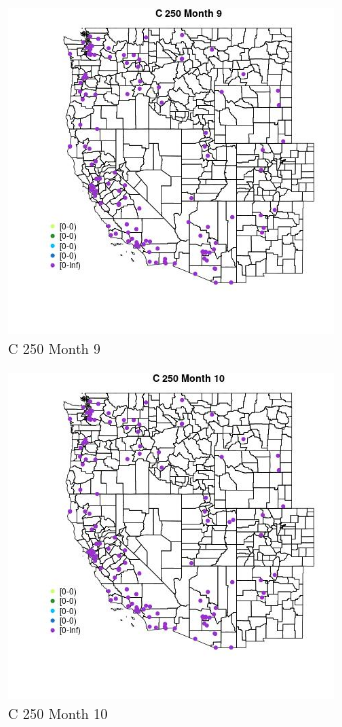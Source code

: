 \begin{figure} 
\centering  
\includegraphics[width=0.77\textwidth]{Code_Outputs/Report_ML_input_PM25_Step4_part_e_de_duplicated_aves_MapObsMo9C_250.jpg} 
\caption{\label{fig:Report_ML_input_PM25_Step4_part_e_de_duplicated_avesMapObsMo9C_250}C 250 Month 9} 
\end{figure} 
 

\clearpage 

\begin{figure} 
\centering  
\includegraphics[width=0.77\textwidth]{Code_Outputs/Report_ML_input_PM25_Step4_part_e_de_duplicated_aves_MapObsMo10C_250.jpg} 
\caption{\label{fig:Report_ML_input_PM25_Step4_part_e_de_duplicated_avesMapObsMo10C_250}C 250 Month 10} 
\end{figure} 
 

